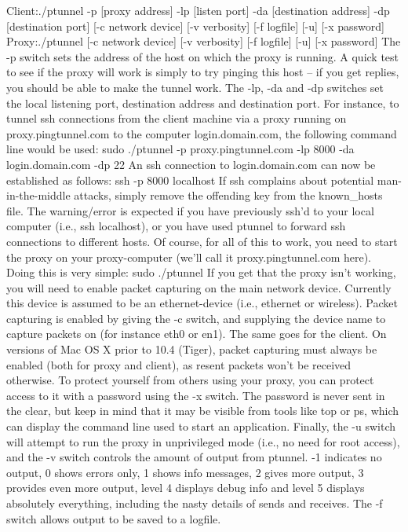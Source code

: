 Client:./ptunnel -p [proxy address] -lp [listen port] -da [destination address] -dp [destination port] [-c network device] [-v verbosity] [-f logfile] [-u] [-x password]
Proxy:./ptunnel [-c network device] [-v verbosity] [-f logfile] [-u] [-x password]
The -p switch sets the address of the host on which the proxy is running. A quick test to see if the proxy will work is simply to try pinging this host – if you get replies, you should be able to make the tunnel work.
The -lp, -da and -dp switches set the local listening port, destination address and destination port. For instance, to tunnel ssh connections from the client machine via a proxy running on proxy.pingtunnel.com to the computer login.domain.com, the following command line would be used:
sudo ./ptunnel -p proxy.pingtunnel.com -lp 8000 -da login.domain.com -dp 22
An ssh connection to login.domain.com can now be established as follows:
ssh -p 8000 localhost
If ssh complains about potential man-in-the-middle attacks, simply remove the offending key from the known_hosts file. The warning/error is expected if you have previously ssh’d to your local computer (i.e., ssh localhost), or you have used ptunnel to forward ssh connections to different hosts.
Of course, for all of this to work, you need to start the proxy on your proxy-computer (we’ll call it proxy.pingtunnel.com here). Doing this is very simple:
sudo ./ptunnel
If you get that the proxy isn’t working, you will need to enable packet capturing on the main network device. Currently this device is assumed to be an ethernet-device (i.e., ethernet or wireless). Packet capturing is enabled by giving the -c switch, and supplying the device name to capture packets on (for instance eth0 or en1). The same goes for the client. On versions of Mac OS X prior to 10.4 (Tiger), packet capturing must always be enabled (both for proxy and client), as resent packets won’t be received otherwise.
To protect yourself from others using your proxy, you can protect access to it with a password using the -x switch. The password is never sent in the clear, but keep in mind that it may be visible from tools like top or ps, which can display the command line used to start an application.
Finally, the -u switch will attempt to run the proxy in unprivileged mode (i.e., no need for root access), and the -v switch controls the amount of output from ptunnel. -1 indicates no output, 0 shows errors only, 1 shows info messages, 2 gives more output, 3 provides even more output, level 4 displays debug info and level 5 displays absolutely everything, including the nasty details of sends and receives. The -f switch allows output to be saved to a logfile.


%









